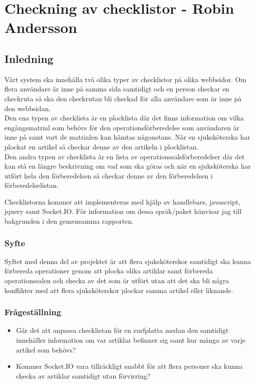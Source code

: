 \section{Checkning av checklistor - Robin Andersson}
\subsection{Inledning}
Vårt system ska innehålla två olika typer av checklistor på olika webbsidor. Om flera användare är inne på samma sida samtidigt och en person checkar en checkruta så ska den checkrutan bli checkad för alla användare som är inne på den webbsidan.\\

Den ena typen av checklista är en plocklista där det finns information om vilka engångsmatrial som behövs för den operationsförberedelse som användaren är inne på samt vart de matrialen kan hämtas någonstans. När en sjuksköterska har plockat en artikel så checkar denne av den artikeln i plocklistan.\\

Den andra typen av checklista är en lista av operationssalsförberedelser där det kan stå en längre beskrivning om vad som ska göras och när en sjuksköterska har utfört hela den förberedelsen så checkar denne av den förberedelsen i förberedelselistan.

Checklistorna kommer att implementeras med hjälp av handlebars, javascript, jquery samt Socket.IO. För information om dessa språk/paket hänvisar jag till bakgrunden i den gemensamma rapporten.

\subsubsection{Syfte}
Syftet med denna del av projektet är att flera sjuksköterskor samtidigt ska kunna förbereda operationer genom att plocka olika artiklar samt förbereda operationssalen och checka av det som är utfört utan att det ska bli några konflikter med att flera sjuksköterskor plockar samma artikel eller liknande.

\subsubsection{Frågeställning}
\begin{itemize}
\item Går det att anpassa checklistan för en surfplatta medan den samtidigt innehåller information om var artiklar befinner sig samt hur många av varje artikel som behövs?
\item Kommer Socket.IO vara tillräckligt snabbt för att flera personer ska kunna checka av artiklar samtidigt utan förvirring?
\end{itemize}

